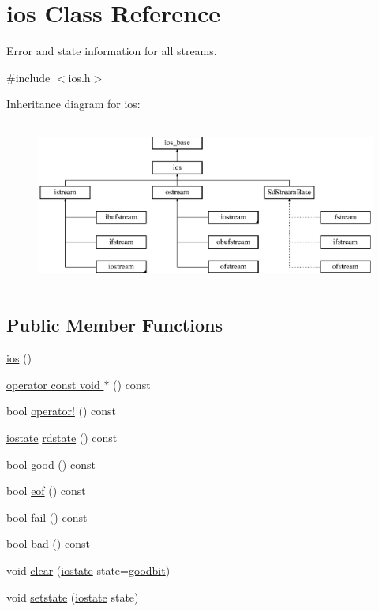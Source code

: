 \hypertarget{classios}{}\section{ios Class Reference}
\label{classios}


Error and state information for all streams.  




{\ttfamily \#include $<$ios.\+h$>$}

Inheritance diagram for ios\+:\begin{figure}[H]
\begin{center}
\leavevmode
\includegraphics[height=5.490196cm]{classios}
\end{center}
\end{figure}
\subsection*{Public Member Functions}
\begin{DoxyCompactItemize}
\item 
\hyperlink{classios_adc5dbd7b69da79493ebc84aa1e681aaa}{ios} ()
\item 
\hyperlink{classios_a8c2e7e42e31d3d7898a51c0bc837b2a3}{operator const void $\ast$} () const 
\item 
bool \hyperlink{classios_a1ae2d4f1ccdfcaaef6a3a8ac9e28c267}{operator!} () const 
\item 
\hyperlink{classios__base_aef19291eeae0f072ac42c6ba1fe3033c}{iostate} \hyperlink{classios_aacc57e1e46e23f2f54898ff6a89129a2}{rdstate} () const 
\item 
bool \hyperlink{classios_a5fdf9247f642a7a5c5a21323ffd45366}{good} () const 
\item 
bool \hyperlink{classios_ad2f091f3ed1a2e13f62557854c0885a7}{eof} () const 
\item 
bool \hyperlink{classios_a1c7b563046a50c5a0430405964998034}{fail} () const 
\item 
bool \hyperlink{classios_a7daa417c60277a4a4a452df4ad0af8e6}{bad} () const 
\item 
void \hyperlink{classios_aa49ed6670d1743e7a373b2d915ec739a}{clear} (\hyperlink{classios__base_aef19291eeae0f072ac42c6ba1fe3033c}{iostate} state=\hyperlink{classios__base_a07a00996a6e525b88bdfe7935d5ead05}{goodbit})
\item 
void \hyperlink{classios_aee5d194656bdfb0c8621b23ea2f51afb}{setstate} (\hyperlink{classios__base_aef19291eeae0f072ac42c6ba1fe3033c}{iostate} state)
\end{DoxyCompactItemize}
